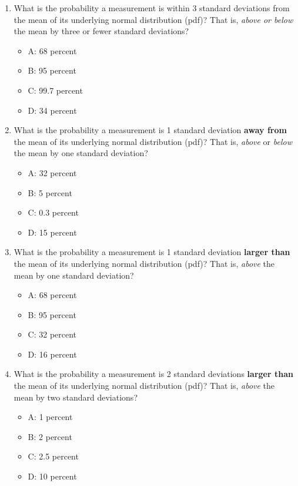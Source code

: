 \documentclass{article}
\begin{document}
\begin{enumerate}
\item What is the probability a measurement is within 3 standard deviations from the mean of its underlying normal distribution (pdf)?  That is, \textit{above or below} the mean by three or fewer standard deviations?
\begin{itemize}
\item A: 68 percent
\item B: 95 percent
\item C: 99.7 percent
\item D: 34 percent
\end{itemize}
\item What is the probability a measurement is 1 standard deviation \textbf{away from} the mean of its underlying normal distribution (pdf)?  That is, \textit{above} or \textit{below} the mean by one standard deviation?
\begin{itemize}
\item A: 32 percent
\item B: 5 percent
\item C: 0.3 percent
\item D: 15 percent
\end{itemize}
\item What is the probability a measurement is 1 standard deviation \textbf{larger than} the mean of its underlying normal distribution (pdf)?  That is, \textit{above} the mean by one standard deviation?
\begin{itemize}
\item A: 68 percent
\item B: 95 percent
\item C: 32 percent
\item D: 16 percent
\end{itemize}
\item What is the probability a measurement is 2 standard deviations \textbf{larger than} the mean of its underlying normal distribution (pdf)?  That is, \textit{above} the mean by two standard deviations?
\begin{itemize}
\item A: 1 percent
\item B: 2 percent
\item C: 2.5 percent
\item D: 10 percent
\end{itemize}
\end{enumerate}
\end{document}
